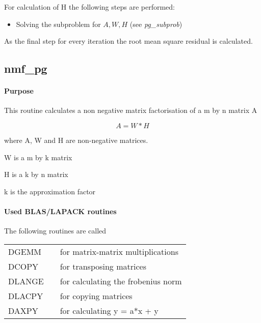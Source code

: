 \documentclass[a4paper,10pt]{scrartcl}
\begin{document}
					For calculation of H the following steps are performed:\newline
					
					\begin{itemize}
					 \item Solving the subproblem for $A, W, H$ (see \emph{pg\_subprob})\newline
					\end{itemize}


					As the final step for every iteration the root mean square residual is
					calculated.


		\subsection{nmf\_pg}

			\paragraph{Purpose}

					This routine calculates a non negative matrix factorisation of a m by n 
					matrix A\newline
					
					\begin{equation*}
						A = W * H
					\end{equation*}

 					where A, W and H are non-negative matrices.

 					W is a m by k matrix

 					H is a k by n matrix

 					k is the approximation factor



			\paragraph{Used BLAS/LAPACK routines}

					The following routines are called\newline

					\begin{tabular}{lcl}
						DGEMM && for matrix-matrix multiplications\\
						DCOPY && for transposing matrices\\
						DLANGE && for calculating the frobenius norm\\
						DLACPY && for copying matrices\\
						DAXPY && for calculating y = a*x + y\\
					\end{tabular}
\end{document}

